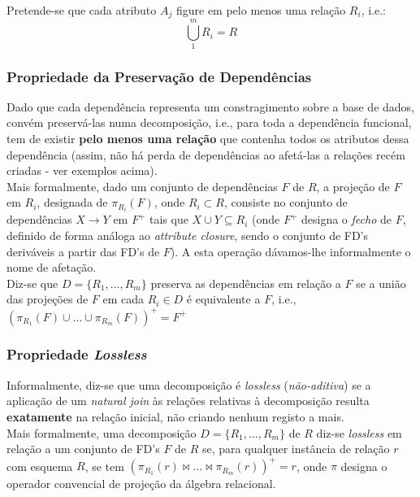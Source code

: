 \documentclass[oneside]{book}
\theoremstyle{definition}
\begin{document}
Pretende-se que cada atributo $A_j$ figure em pelo menos uma relação $R_i$, i.e.:
\vspace{-0.3em}
\[
    \bigcup_1^{m} R_i = R
\]

\subsubsection*{Propriedade da Preservação de Dependências}

Dado que cada dependência representa um constragimento sobre a base de dados, convém preservá-las numa decomposição, i.e., para toda a dependência funcional, tem de existir \textbf{pelo menos uma relação} que contenha todos os atributos dessa dependência (assim, não há perda de dependências ao afetá-las a relações recém criadas - ver exemplos acima). \\
Mais formalmente, dado um conjunto de dependências $F$ de $R$, a projeção de $F$ em $R_i$, designada de $\pi_{R_i}(F)$, onde $R_i \subset R$, consiste no conjunto de dependências $X \rightarrow Y$ em $F^{+}$ tais que $X \cup Y \subseteq R_i$ (onde $F^{+}$ designa o \textit{fecho} de $F$, definido de forma análoga ao \textit{attribute closure}, sendo o conjunto de FD's deriváveis a partir das FD's de $F$). A esta operação dávamos-lhe informalmente o nome de afetação.\\
Diz-se que $D = \{ R_1, ..., R_m\}$ preserva as dependências em relação a $F$ se a união das projeções de $F$ em cada $R_i \in D$ é equivalente a $F$, i.e., $( \pi_{R_1}(F) \cup  ... \cup \pi_{R_m}(F))^{+} = F^{+}$

\subsubsection*{Propriedade \textit{Lossless}}

Informalmente, diz-se que uma decomposição é \textit{lossless} (\textit{não-aditiva}) se a aplicação de um \textit{natural join} às relações relativas à decomposição resulta \textbf{exatamente} na relação inicial, não criando nenhum registo a mais.\\
Mais formalmente, uma decomposição $D = \{ R_1, ..., R_m\}$ de $R$ diz-se \textit{lossless} em relação a um conjunto de FD's $F$ de $R$ se, para qualquer instância de relação $r$ com esquema $R$, se tem  $( \pi_{R_1}(r) \bowtie  ... \bowtie \pi_{R_m}(r))^{+} = r$, onde $\pi$ designa o operador convencial de projeção da álgebra relacional.
\end{document}
